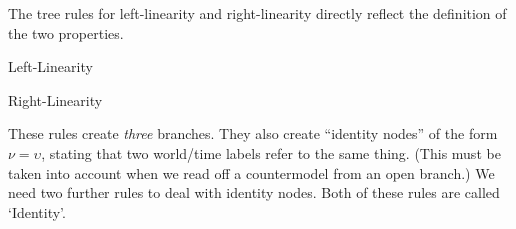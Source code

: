 
The tree rules for left-linearity and right-linearity directly reflect the
definition of the two properties.
\bigskip
\begin{center}

  \begin{minipage}[t]{0.4\textwidth} \centering
    Left-Linearity
    
    \tree[2]{
      & \barenode{$\nu < \omega$} & \\
      & \dotbelowbaretribnode{$\upsilon < \omega$} & \\
      && \\
      && \\
      \barenode{$\nu < \upsilon$} & \barenode{$\nu = \upsilon$} & \barenode{$\upsilon < \nu $}
    }
  \end{minipage}
  \begin{minipage}[t]{0.4\textwidth} \centering
    Right-Linearity

    \tree[2]{
      & \barenode{$\omega < \nu$} & \\
      & \dotbelowbaretribnode{$\omega < \upsilon$} & \\
      && \\
      && \\
      \barenode{$\nu < \upsilon$} & \barenode{$\nu = \upsilon$} & \barenode{$\upsilon < \nu $}
    }
  \end{minipage}
\end{center}
\bigskip%
These rules create \emph{three} branches. They also create ``identity nodes'' of
the form $\nu = \upsilon$, stating that two world/time labels refer to the same
thing. (This must be taken into account when we read off a countermodel from an
open branch.) We need two further rules to deal with identity nodes. Both of
these rules are called `Identity'.%
\bigskip
\begin{center}
  \begin{minipage}[t]{0.3\textwidth} \centering
    
  \end{minipage}
  \begin{minipage}[t]{0.3\textwidth} \centering

  \end{minipage}
\end{center}

